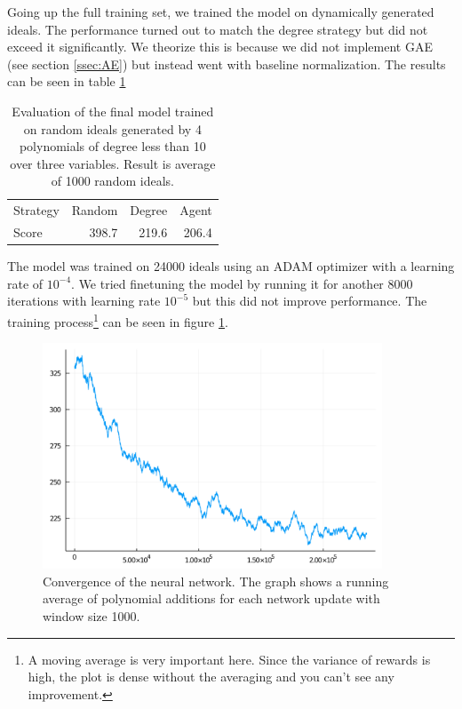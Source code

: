 \documentclass{article}
\theoremstyle{changedot}
\theoremstyle{changedotbreak}
\theoremstyle{nonumberplain}
\begin{document}
Going up the full training set, we trained the model on dynamically generated ideals.  The performance turned out to match the degree strategy but did not exceed it significantly. We theorize this is because we did not implement GAE (see section \ref{ssec:AE}) but instead went with baseline normalization. The results can be seen in table \ref{tab:eval}

\begin{table}
  \centering
  \begin{tabular}{l|rrr}
    Strategy & Random & Degree & Agent \\
    Score    &  398.7 &  219.6 & 206.4
  \end{tabular}
  \caption{Evaluation of the final model trained on random ideals generated by 4 polynomials of degree less than 10 over three variables. Result is average of 1000 random ideals.}
  \label{tab:eval}
\end{table}

The model was trained on 24000 ideals using an ADAM optimizer with a learning rate of $10^{-4}$. We tried finetuning the model by running it for another 8000 iterations with learning rate $10^{-5}$ but this did not improve performance. The training process\footnote{A moving average is very important here. Since the variance of rewards is high, the plot is dense without the averaging and you can't see any improvement.} can be seen in figure \ref{fig:convergence}.

\begin{figure}[h!]
  \includegraphics[width=0.9\textwidth]{full_24k_En4_2layer.png}
  \caption{Convergence of the neural network. The graph shows a running average of polynomial additions for each network update with window size 1000.}
  \label{fig:convergence}
\end{figure}
\end{document}
